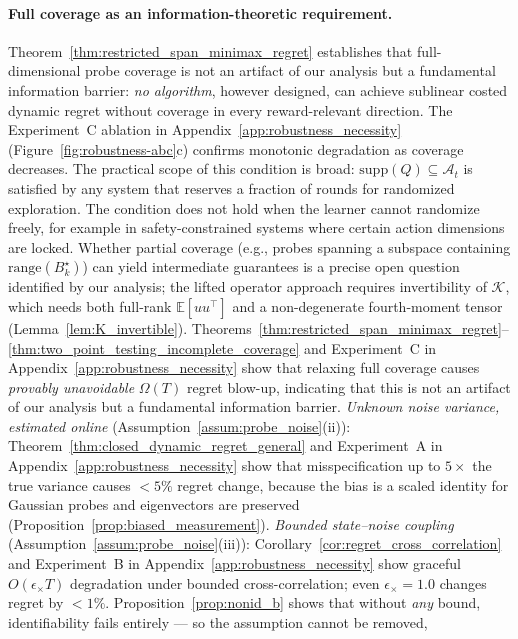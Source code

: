 \documentclass{article}
\newcommand{\E}{\mathbb{E}}
\newcommand{\cA}{\mathcal{A}}
\newcommand{\range}{\mathrm{range}}
\newcommand{\supp}{\mathrm{supp}}
\begin{document}
    \paragraph{Full coverage as an information-theoretic requirement.}
    Theorem~\ref{thm:restricted_span_minimax_regret} establishes that full-dimensional probe coverage is not an artifact of our analysis but a fundamental information barrier: \emph{no algorithm}, however designed, can achieve sublinear costed dynamic regret without coverage in every reward-relevant direction.
    The Experiment~C ablation in Appendix~\ref{app:robustness_necessity}
    (Figure~\ref{fig:robustness-abc}c) confirms monotonic degradation as coverage decreases.
    The practical scope of this condition is broad: $\supp(Q) \subseteq \cA_t$ is satisfied by any system that reserves a fraction of rounds for randomized exploration. The condition does not hold when the learner cannot randomize freely, for example in safety-constrained systems where certain action dimensions are locked.
    Whether partial coverage (e.g., probes spanning a subspace containing $\range(B_k^\star)$) can yield intermediate
    guarantees is a precise open question identified by our analysis; the lifted operator approach requires invertibility of $\mathcal{K}$, which needs both full-rank $\E[uu^\top]$ and a non-degenerate fourth-moment tensor (Lemma~\ref{lem:K_invertible}).
Theorems~\ref{thm:restricted_span_minimax_regret}--\ref{thm:two_point_testing_incomplete_coverage}
  and Experiment~C in Appendix~\ref{app:robustness_necessity} show that relaxing full coverage causes
  \emph{provably unavoidable} $\Omega(T)$ regret blow-up, indicating that this is not
  an artifact of our analysis but a fundamental information barrier.
  \emph{Unknown noise variance, estimated online} (Assumption~\ref{assum:probe_noise}(ii)):
  Theorem~\ref{thm:closed_dynamic_regret_general} and Experiment~A in Appendix~\ref{app:robustness_necessity} show
  that misspecification up to $5\times$ the true variance causes $<5\%$
  regret change, because the bias is a scaled identity for Gaussian probes
  and eigenvectors are preserved
  (Proposition~\ref{prop:biased_measurement}).
  \emph{Bounded state--noise coupling} (Assumption~\ref{assum:probe_noise}(iii)):
  Corollary~\ref{cor:regret_cross_correlation} and Experiment~B in Appendix~\ref{app:robustness_necessity} show
  graceful $O(\epsilon_\times T)$ degradation under bounded
  cross-correlation; even $\epsilon_\times = 1.0$ changes regret by $<1\%$.
  Proposition~\ref{prop:nonid_b} shows that without \emph{any} bound,
  identifiability fails entirely --- so the assumption cannot be removed,
\end{document}
